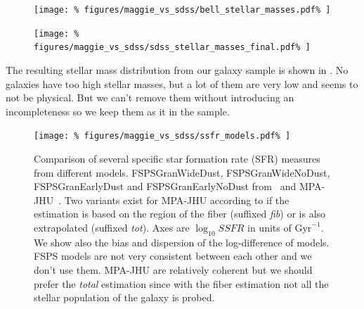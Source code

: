 \begin{figure}[htb]
    \centering
    \begin{minipage}{0.49\linewidth}
        \centering
        \texttt{[image: \%
            figures/maggie\_vs\_sdss/bell\_stellar\_masses.pdf\%
        ]}
    \end{minipage}
    \begin{minipage}{0.49\linewidth}
        \centering
        \texttt{[image: \%
            figures/maggie\_vs\_sdss/sdss\_stellar\_masses\_final.pdf\%
        ]}
    \end{minipage}
\end{figure}

The resulting stellar mass distribution from our galaxy sample is shown in
. No galaxies have too high stellar
masses, but a lot of them are very low and seems to not be physical. But we
can't remove them without introducing an incompleteness so we keep them as
it in the sample.

\begin{figure}[htp]
    \centering
    \texttt{[image: \%
        figures/maggie\_vs\_sdss/ssfr\_models.pdf\%
    ]}
    \caption{Comparison of several specific star formation rate (SFR)
        measures from different models. FSPSGranWideDust,
        FSPSGranWideNoDust, FSPSGranEarlyDust and FSPSGranEarlyNoDust
        from~\cite{Conroy+09} and MPA-JHU~\cite{Brinchmann+04, Kauffmann+03,
        Tremonti+04}. Two variants exist for MPA-JHU according to if the
        estimation is based on the region of the fiber (suffixed \emph{fib})
        or is also extrapolated (suffixed \emph{tot}). Axes are $\log_{10}
        SSFR$ in units of $\mathrm{Gyr}^{-1}$. We show also the bias and
        dispersion of the log-difference of models. FSPS models are not very
        consistent between each other and we don't use them. MPA-JHU are
        relatively coherent but we should prefer the \emph{total} estimation
    since with the fiber estimation not all the stellar population of the
galaxy is probed.\label{fig:sfr_comparison}}
\end{figure}

